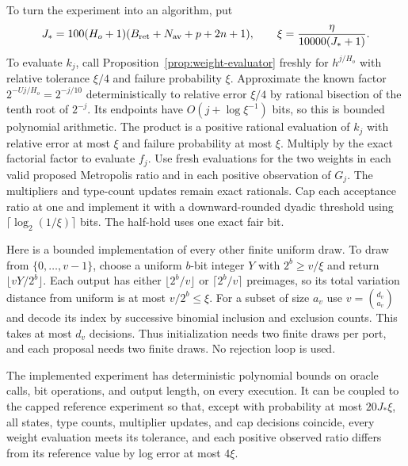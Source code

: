 To turn the experiment into an algorithm, put
\begin{equation}
 J_*=100(H_o+1)(B_{\rm ret}+N_{\rm av}+p+2n+1),
 \qquad \xi=\frac{\eta}{10000(J_*+1)}.
 \label{eq:counting-bit-parameters}
\end{equation}
To evaluate $k_j$, call Proposition~\ref{prop:weight-evaluator} freshly
for $h^{j/H_o}$ with relative tolerance $\xi/4$ and failure probability
$\xi$.  Approximate the known factor $2^{-Uj/H_o}=2^{-j/10}$
deterministically to relative error $\xi/4$ by rational bisection of
the tenth root of $2^{-j}$.  Its endpoints have $O(j+\log\xi^{-1})$
bits, so this is bounded polynomial arithmetic.  The product is a
positive rational evaluation of $k_j$ with relative error at most
$\xi$ and failure probability at most $\xi$.  Multiply by the exact
factorial factor to evaluate $f_j$.  Use fresh
evaluations for the two weights in each valid proposed Metropolis
ratio and in each positive observation of $G_j$.  The multipliers
and type-count updates remain exact rationals.  Cap each acceptance
ratio at one and implement it with a downward-rounded dyadic threshold
using $\lceil\log_2(1/\xi)\rceil$ bits.  The half-hold uses one exact
fair bit.

Here is a bounded implementation of every other finite uniform draw.
To draw from $\{0,\ldots,v-1\}$, choose a uniform $b$-bit integer
$Y$ with $2^b\geq v/\xi$ and return $\lfloor vY/2^b\rfloor$.
Each output has either $\lfloor2^b/v\rfloor$ or
$\lceil2^b/v\rceil$ preimages, so its total variation distance from
uniform is at most $v/2^b\leq\xi$.
For a subset of size $a_v$ use
$v=\binom{d_v}{a_v}$ and decode its index by successive binomial
inclusion and exclusion counts.  This takes at most $d_v$ decisions.
Thus initialization needs two finite draws per port, and each
proposal needs two finite draws.  No rejection loop is used.

\begin{lemma}
\label{lem:counting-bits}
The implemented experiment has deterministic polynomial bounds on
oracle calls, bit operations, and output length, on every execution.
It can be coupled to the capped reference experiment so that, except
with probability at most $20J_*\xi$, all states, type counts,
multiplier updates, and cap decisions coincide, every weight evaluation
meets its tolerance, and each positive observed ratio differs from
its reference value by log error at most $4\xi$.
\end{lemma}

